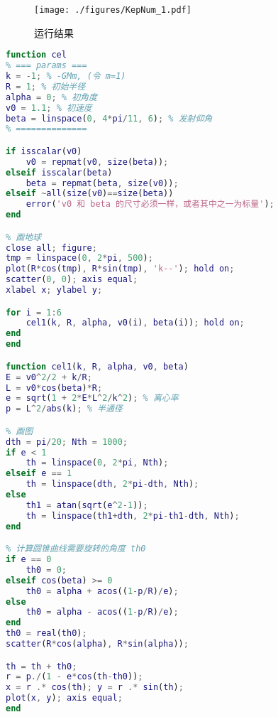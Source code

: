 
\begin{issues}
\issueDraft
{}
\end{issues}

\begin{figure}[ht]
\centering
\texttt{[image: ./figures/KepNum\_1.pdf]}
\caption{运行结果} \label{KepNum_fig1}
\end{figure}

\begin{lstlisting}[language=matlab]
% 已知初始位置、发射速度、发射方向， 求轨道以及运动方程
function cel
% === params ===
k = -1; % -GMm, (令 m=1)
R = 1; % 初始半径
alpha = 0; % 初角度
v0 = 1.1; % 初速度
beta = linspace(0, 4*pi/11, 6); % 发射仰角
% ==============

if isscalar(v0)
    v0 = repmat(v0, size(beta));
elseif isscalar(beta)
    beta = repmat(beta, size(v0));
elseif ~all(size(v0)==size(beta))
    error('v0 和 beta 的尺寸必须一样，或者其中之一为标量');
end

% 画地球
close all; figure;
tmp = linspace(0, 2*pi, 500);
plot(R*cos(tmp), R*sin(tmp), 'k--'); hold on;
scatter(0, 0); axis equal;
xlabel x; ylabel y;

for i = 1:6
    cel1(k, R, alpha, v0(i), beta(i)); hold on;
end
end

function cel1(k, R, alpha, v0, beta)
E = v0^2/2 + k/R;
L = v0*cos(beta)*R;
e = sqrt(1 + 2*E*L^2/k^2); % 离心率
p = L^2/abs(k); % 半通径

% 画图
dth = pi/20; Nth = 1000;
if e < 1
    th = linspace(0, 2*pi, Nth);
elseif e == 1
    th = linspace(dth, 2*pi-dth, Nth);
else
    th1 = atan(sqrt(e^2-1));
    th = linspace(th1+dth, 2*pi-th1-dth, Nth);
end

% 计算圆锥曲线需要旋转的角度 th0
if e == 0
    th0 = 0;
elseif cos(beta) >= 0
    th0 = alpha + acos((1-p/R)/e);
else
    th0 = alpha - acos((1-p/R)/e);
end
th0 = real(th0);
scatter(R*cos(alpha), R*sin(alpha));

th = th + th0;
r = p./(1 - e*cos(th-th0));
x = r .* cos(th); y = r .* sin(th);
plot(x, y); axis equal;
end
\end{lstlisting}
